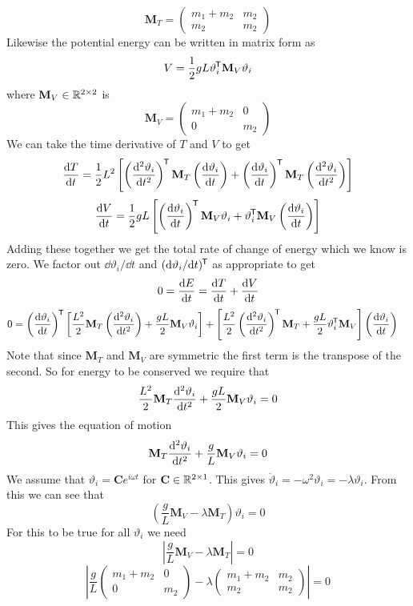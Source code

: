 \documentclass{article}
\newcommand{\mat}[1]{\mathbf{#1}}
\begin{document}
    \[\mat M_T = \begin{pmatrix}
        m_1 + m_2 & m_2\\
        m_2 & m_2
    \end{pmatrix}\]
    Likewise the potential energy can be written in matrix form as
    \[V = \frac{1}{2}gL\vartheta_i\trans\mat M_V\vartheta_i\]
    where \(\mat M_V\in\bb R^{2\times2}\) is
    \[\mat M_V = \begin{pmatrix}
        m_1 + m_2 & 0\\
        0 & m_2
    \end{pmatrix}\]
    We can take the time derivative of \(T\) and \(V\) to get
    \[\dv{T}{t} = \frac{1}{2}L^2\left[\left(\dv[2]{\vartheta_i}{t}\right)\trans\mat M_T\left(\dv{\vartheta_i}{t}\right) + \left(\dv{\vartheta_i}{t}\right)\trans \mat M_T\left(\dv[2]{\vartheta_i}{t}\right)\right]\]
    \[\dv{V}{t} = \frac{1}{2}gL\left[\left(\dv{\vartheta_i}{t}\right) \trans\mat M_V\vartheta_i + \vartheta_i\trans\mat M_V \left(\dv{\vartheta_i}{t}\right)\right]\]
    Adding these together we get the total rate of change of energy which we know is zero.
    We factor out \(\dd\vartheta_i/\dd t\) and \((\dd\vartheta_i/\dd t)^{\mkern-1.5mu\mathsf{T}}\) as appropriate to get
    \[0 = \dv{E}{t} = \dv{T}{t} + \dv{V}{t}\]
    \begin{align*}
        0 &= \left(\dv{\vartheta_i}{t}\right)\trans\left[\frac{L^2}{2}\mat M_T\left(\dv[2]{\vartheta_i}{t}\right) + \frac{gL}{2}\mat M_V\vartheta_i\right] + \left[\frac{L^2}{2}\left(\dv[2]{\vartheta_i}{t}\right)\trans\mat M_T + \frac{gL}{2}\vartheta_i\trans\mat M_V\right]\left(\dv{\vartheta_i}{t}\right)
    \end{align*}
    Note that since \(\mat M_T\) and \(\mat M_V\) are symmetric the first term is the transpose of the second.
    So for energy to be conserved we require that
    \[\frac{L^2}{2}\mat M_T\dv[2]{\vartheta_i}{t} + \frac{gL}{2}\mat M_V\vartheta_i = 0\]
    This gives the equation of motion
    \[\mat M_T\dv[2]{\vartheta_i}{t} + \frac{g}{L}\mat M_V\vartheta_i = 0\]
    We assume that \(\vartheta_i = \mat Ce^{i\omega t}\) for \(\mat C\in\bb R^{2\times1}\).
    This gives \(\ddot\vartheta_i = -\omega^2\vartheta_i = -\lambda\vartheta_i\).
    From this we can see that
    \[\left(\frac{g}{L}\mat M_V - \lambda\mat M_T\right)\vartheta_i = 0\]
    For this to be true for all \(\vartheta_i\) we need
    \[\left|\frac{g}{L}\mat M_V - \lambda\mat M_T\right| = 0\]
    \[
        \left|\frac{g}{L}
        \begin{pmatrix}
            m_1 + m_2 & 0\\
            0 & m_2
        \end{pmatrix}
        - \lambda
        \begin{pmatrix}
            m_1 + m_2 & m_2\\
            m_2 & m_2
        \end{pmatrix}
        \right| = 0
    \]
\end{document}
